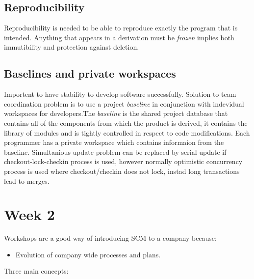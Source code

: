 \documentclass{article}
\begin{document}
    \subsection{Reproducibility}
    Reproducibility is needed to be able to reproduce exactly the program that is intended.
    Anything that appears in a derivation must be \textit{frozen} implies both immutibility and protection against deletion.

    \subsection{Baselines and private workspaces}
    Importent to have stability to develop software successfully. Solution to team coordination problem is to use a project \textit{baseline} in conjunction with indevidual workspaces for developers.The \textit{baseline} is the shared project database that contains all of the components from which the product is derived, it contains the library of modules and is tightly controlled in respect to code modifications. Each programmer has a private workspace which contains informaion from the baseline. Simultanious update problem can be replaced by serial update if checkout-lock-checkin process is used, however normally optimistic concurrency process is used where checkout/checkin does not lock, instad long transactions lead to merges.

    \section{Week 2}
    Workshops are a good way of introducing SCM  to a company because:

    \begin{itemize}
    \item Evolution of company wide processes and plans.
    \end{itemize}
    Three main concepts:
\end{document}
